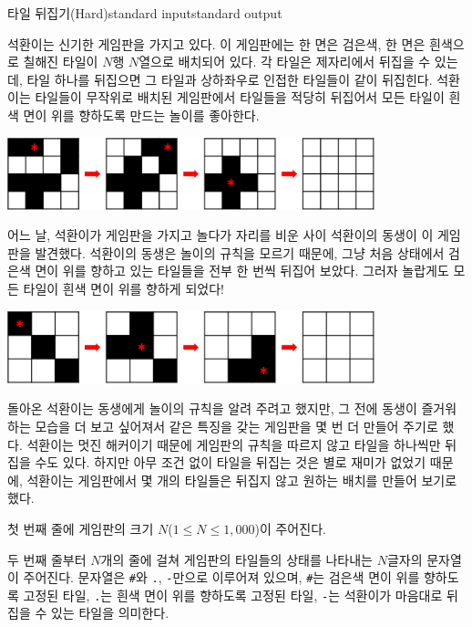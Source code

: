 \begin{problem}{타일 뒤집기(Hard)}{standard input}{standard output}

석환이는 신기한 게임판을 가지고 있다. 이 게임판에는 한 면은 검은색, 한 면은 흰색으로 칠해진 타일이 $N$행 $N$열으로 배치되어 있다. 각 타일은 제자리에서 뒤집을 수 있는데, 타일 하나를 뒤집으면 그 타일과 상하좌우로 인접한 타일들이 같이 뒤집힌다. 석환이는 타일들이 무작위로 배치된 게임판에서 타일들을 적당히 뒤집어서 모든 타일이 흰색 면이 위를 향하도록 만드는 놀이를 좋아한다.

\begin{center}
  \includegraphics[width=0.8\textwidth]{tile1.png}
\end{center}

어느 날, 석환이가 게임판을 가지고 놀다가 자리를 비운 사이 석환이의 동생이 이 게임판을 발견했다. 석환이의 동생은 놀이의 규칙을 모르기 때문에, 그냥 처음 상태에서 검은색 면이 위를 향하고 있는 타일들을 전부 한 번씩 뒤집어 보았다. 그러자 놀랍게도 모든 타일이 흰색 면이 위를 향하게 되었다!

\begin{center}
  \includegraphics[width=0.8\textwidth]{tile2.png}
\end{center}

돌아온 석환이는 동생에게 놀이의 규칙을 알려 주려고 했지만, 그 전에 동생이 즐거워하는 모습을 더 보고 싶어져서 같은 특징을 갖는 게임판을 몇 번 더 만들어 주기로 했다. 석환이는 멋진 해커이기 때문에 게임판의 규칙을 따르지 않고 타일을 하나씩만 뒤집을 수도 있다. 하지만 아무 조건 없이 타일을 뒤집는 것은 별로 재미가 없었기 때문에, 석환이는 게임판에서 몇 개의 타일들은 뒤집지 않고 원하는 배치를 만들어 보기로 했다.

\InputFile
첫 번째 줄에 게임판의 크기 $N$($1 \le N \le 1,000$)이 주어진다.

두 번째 줄부터 $N$개의 줄에 걸쳐 게임판의 타일들의 상태를 나타내는 $N$글자의 문자열이 주어진다. 문자열은 \texttt{\#}와 \texttt{.}, \texttt{-}만으로 이루어져 있으며, \texttt{\#}는 검은색 면이 위를 향하도록 고정된 타일, \texttt{.}는 흰색 면이 위를 향하도록 고정된  타일, \texttt{-}는 석환이가 마음대로 뒤집을 수 있는 타일을 의미한다.


\end{problem}
